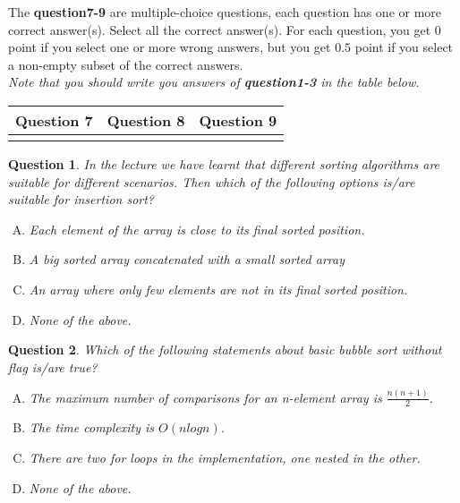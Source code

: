\documentclass[10.5pt]{article}
\newtheorem{Q}{Question}
\begin{document}
The \textbf{question7-9} are multiple-choice questions, each question has one or more correct answer(s). Select all the correct answer(s). For each question, you get $0$ point if you select one or more wrong answers, but you get $0.5$ point if you select a non-empty subset of the correct answers.\\
\textit{Note that you should write you answers of \textbf{question1-3} in the table below.}
\begin{table}[htbp]
	\begin{tabular}{|p{2cm}|p{2cm}|p{2cm}|}
		\hline 
		Question 7 & Question 8 & Question 9\\
		\hline 
		& & \\ 
		\hline 
	\end{tabular} 
\end{table}

    \begin{Q}
		In the lecture we have learnt that different sorting algorithms are suitable for different scenarios. Then which of the following options is/are suitable for insertion sort?
		\begin{enumerate}[(A)]
			\item Each element of the array is close to its final sorted position.
			\item A big sorted array concatenated with a small sorted array 
			\item An array where only few elements are not in its final sorted position.
			\item None of the above.
		\end{enumerate}
	\end{Q}
	
	\begin{Q}
		Which of the following statements about basic bubble sort without ﬂag is/are true?
		\begin{enumerate}[(A)]
			\item The maximum number of comparisons for an n-element array is $\frac{n(n+1)}{2}$.
			\item The time complexity is $O(nlogn)$.
			\item There are two for loops in the implementation, one nested in the other.
			\item None of the above.
		\end{enumerate}
	\end{Q}
	
\end{document}
